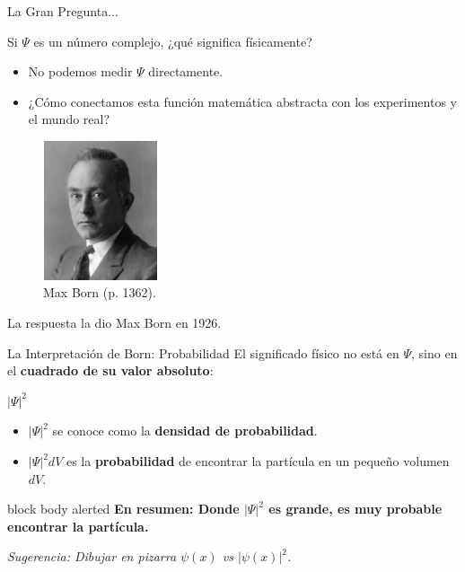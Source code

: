 \documentclass[12pt,aspectratio=169]{beamer}
\begin{document}
		\begin{frame}{La Gran Pregunta...}
		\begin{alertblock}{Si $\Psi$ es un número complejo, ¿qué significa físicamente?}
			\begin{itemize}
				\item No podemos medir $\Psi$ directamente.
				\item ¿Cómo conectamos esta función matemática abstracta con los experimentos y el mundo real?
			\end{itemize}
		\end{alertblock}
		\begin{figure}
			\centering
			\includegraphics[width=0.3\textwidth]{../Imagenes/MaxBorn} %
			\caption{Max Born (p. 1362).}
		\end{figure}
		\centering La respuesta la dio Max Born en 1926.
	\end{frame}
	\begin{frame}{La Interpretación de Born: Probabilidad}
	El significado físico no está en $\Psi$, sino en el \textbf{cuadrado de su valor absoluto}:
	\begin{center}
		\Huge $|\Psi|^2$
	\end{center}
	\begin{itemize}
		\item $|\Psi|^2$ se conoce como la \textbf{densidad de probabilidad}.
		\item $|\Psi|^2 dV$ es la \textbf{probabilidad} de encontrar la partícula en un pequeño volumen $dV$.
	\end{itemize}
	\vspace{1em}
	\begin{beamercolorbox}[sep=0.3cm,center,wd=\textwidth]{block body alerted}
		\textbf{En resumen: Donde $|\Psi|^2$ es grande, es muy probable encontrar la partícula.}
	\end{beamercolorbox}
	\tiny{\textit{Sugerencia: Dibujar en pizarra $\psi(x)$ vs $|\psi(x)|^2$.}}
\end{frame}	
	
\end{document}

